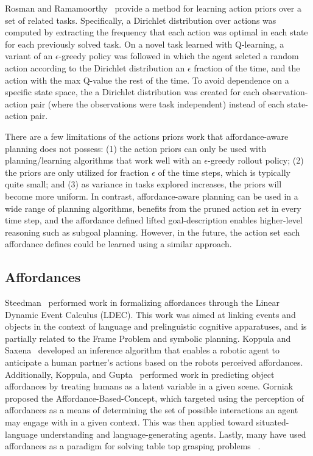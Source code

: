 \documentclass[]{article}
\begin{document}
Rosman and Ramamoorthy~\cite{rosman2012good} provide a method for learning action priors over a set of related tasks. Specifically, a Dirichlet distribution over actions was computed by extracting the frequency that each action was optimal in each state for each previously solved task. On a novel task learned with Q-learning, a variant of an $\epsilon$-greedy policy was followed in which the agent selcted a random action according to the Dirichlet distribution an $\epsilon$ fraction of the time, and the action with the max Q-value the rest of the time. To avoid dependence on a specific state space, the a Dirichlet distribution was created for each observation-action pair (where the observations were task independent) instead of each state-action pair.

There are a few limitations of the actions priors work that affordance-aware planning does not possess: (1) the action priors can only be used with planning/learning algorithms that work well with an $\epsilon$-greedy rollout policy; (2) the priors are only utilized for fraction $\epsilon$ of the time steps, which is typically quite small; and (3) as variance in tasks explored increases, the priors will become more uniform. In contrast, affordance-aware planning can be used in a wide range of planning algorithms, benefits from the pruned action set in every time step, and the affordance defined lifted goal-description enables higher-level reasoning such as subgoal planning. However, in the future, the action set each affordance defines could be learned using a similar approach.

\subsection{Affordances}
Steedman~\citep{steedman02} performed work in formalizing affordances through the Linear Dynamic Event Calculus (LDEC). This work was aimed at linking events and objects in the context of language and prelinguistic cognitive apparatuses, and is partially related to the Frame Problem and symbolic planning. Koppula and Saxena~\citep{koppula13a} developed an inference algorithm that enables a robotic agent to anticipate a human partner's actions based on the robots perceived affordances. Additionally, Koppula, and Gupta~\citep{koppula13c} performed work in predicting object affordances by treating humans as a latent variable in a given scene. Gorniak~\citep{gorniak05} proposed the Affordance-Based-Concept, which targeted
 using the perception of affordances as a means of determining the set of possible interactions an agent may engage with in a given context.
This was then applied toward situated-language understanding and language-generating agents. Lastly, many have used affordances as a paradigm for solving table top grasping problems ~\citep{pas13,sweeney07,detry09,montesano09}.
\end{document}

